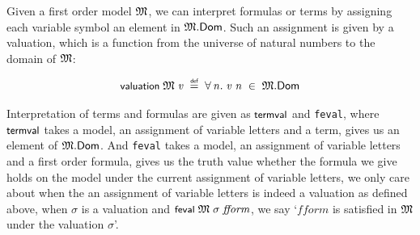 \documentclass[letterpaper]{article}
\renewcommand{\HOLConst}[1]{{\textsf{\upshape\small #1}}}
\renewcommand{\HOLinline}[1]{\ensuremath{#1}}
\newenvironment{holmath}{\begin{displaymath}\begin{array}{l}}{\end{array}\end{displaymath}\ignorespacesafterend}
\begin{document}
Given a first order model \HOLinline{\HOLFreeVar{\ensuremath{\mathfrak{M}}}}, we can interpret formulas or terms by assigning each variable symbol an element in \HOLinline{\HOLFreeVar{\ensuremath{\mathfrak{M}}}.\HOLFieldName{Dom}}. Such an assignment is given by a valuation, which is a function from the universe of natural numbers to the domain of \HOLinline{\HOLFreeVar{\ensuremath{\mathfrak{M}}}}:

\begin{holmath}
  \HOLConst{valuation}\;\HOLFreeVar{\ensuremath{\mathfrak{M}}}\;\HOLFreeVar{v}\;\HOLSymConst{\HOLTokenDefEquality{}}\;\HOLSymConst{\HOLTokenForall{}}\HOLBoundVar{n}.\;\HOLFreeVar{v}\;\HOLBoundVar{n}\;\HOLSymConst{\HOLTokenIn{}}\;\HOLFreeVar{\ensuremath{\mathfrak{M}}}.\HOLFieldName{Dom}
\end{holmath} 

Interpretation of terms and formulas are given as \HOLinline{\HOLConst{termval}} and \texttt{feval}, where \HOLinline{\HOLConst{termval}} takes a model, an assignment of variable letters and a term, gives us an element of \HOLinline{\HOLFreeVar{\ensuremath{\mathfrak{M}}}.\HOLFieldName{Dom}}. And \texttt{feval} takes a model, an assignment of variable letters and a first order formula, gives us the truth value whether the formula we give holds on the model under the current assignment of variable letters, we only care about when the an assignment of variable letters is indeed a valuation as defined above, when $\sigma$ is a valuation and \HOLinline{\HOLConst{feval}\;\HOLFreeVar{\ensuremath{\mathfrak{M}}}\;\HOLFreeVar{\ensuremath{\sigma}}\;\HOLFreeVar{fform}}, we say `$fform$ is satisfied in \HOLinline{\HOLFreeVar{\ensuremath{\mathfrak{M}}}} under the valuation $\sigma$'.
\end{document}
